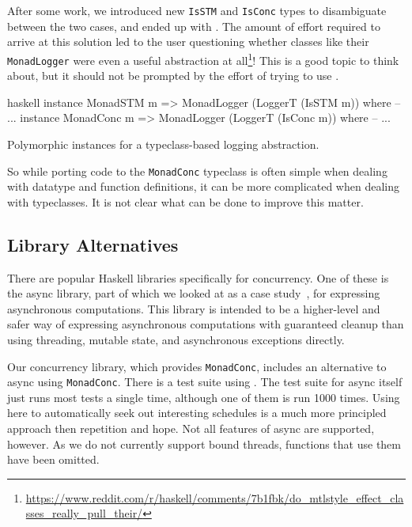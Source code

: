 After some work, we introduced new \verb|IsSTM| and \verb|IsConc|
types to disambiguate between the two cases, and ended up with
.  The amount of effort required to arrive at this
solution led to the user questioning whether classes like their
\verb|MonadLogger| were even a useful abstraction at
all\footnote{\url{https://www.reddit.com/r/haskell/comments/7b1fbk/do_mtlstyle_effect_classes_really_pull_their/}}!
This is a good topic to think about, but it should not be prompted by
the effort of trying to use \dejafu{}.

\begin{listing}
\centering
\begin{cminted}{haskell}
instance MonadSTM  m => MonadLogger (LoggerT (IsSTM  m)) where -- ...
instance MonadConc m => MonadLogger (LoggerT (IsConc m)) where -- ...
\end{cminted}
\caption{Polymorphic instances for a typeclass-based logging abstraction.}\label{lst:mlogger3}
\end{listing}

So while porting code to the \verb|MonadConc| typeclass is often
simple when dealing with datatype and function definitions, it can be
more complicated when dealing with typeclasses.  It is not clear what
can be done to improve this matter.

\subsection{Library Alternatives}

There are popular Haskell libraries specifically for concurrency.  One
of these is the async library\cite{async}, part of which we looked at
as a case study~, for expressing
asynchronous computations.  This library is intended to be a
higher-level and safer way of expressing asynchronous computations
with guaranteed cleanup than using threading, mutable state, and
asynchronous exceptions directly.

Our concurrency library\cite{concurrency}, which provides
\verb|MonadConc|, includes an alternative to async using
\verb|MonadConc|.  There is a test suite using \dejafu{}.  The test
suite for async itself just runs most tests a single time, although
one of them is run 1000 times.  Using \dejafu{} here to automatically
seek out interesting schedules is a much more principled approach then
repetition and hope.  Not all features of async are supported,
however.  As we do not currently support bound threads, functions that
use them have been omitted.


